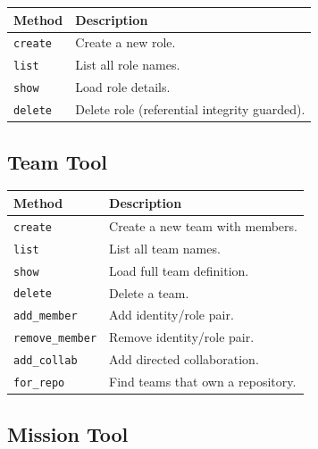 \documentclass[a4paper,10pt]{article}
\begin{document}
\begin{center}
\begin{tabular}{@{}lp{6cm}@{}}
\toprule
\textbf{Method} & \textbf{Description} \\
\midrule
\texttt{create}  & Create a new role. \\
\texttt{list}    & List all role names. \\
\texttt{show}    & Load role details. \\
\texttt{delete}  & Delete role (referential integrity guarded). \\
\bottomrule
\end{tabular}
\end{center}

\subsection{Team Tool}

\begin{center}
\begin{tabular}{@{}lp{6cm}@{}}
\toprule
\textbf{Method} & \textbf{Description} \\
\midrule
\texttt{create}         & Create a new team with members. \\
\texttt{list}           & List all team names. \\
\texttt{show}           & Load full team definition. \\
\texttt{delete}         & Delete a team. \\
\texttt{add\_member}    & Add identity/role pair. \\
\texttt{remove\_member} & Remove identity/role pair. \\
\texttt{add\_collab}    & Add directed collaboration. \\
\texttt{for\_repo}      & Find teams that own a repository. \\
\bottomrule
\end{tabular}
\end{center}

\subsection{Mission Tool}
\end{document}

